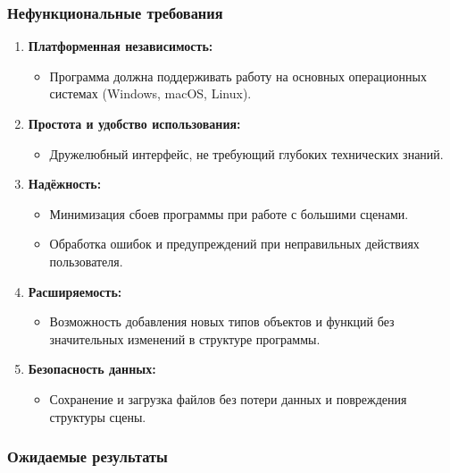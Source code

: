 \subsubsection{Нефункциональные требования}

\begin{enumerate}
    \item \textbf{Платформенная независимость:}
    \begin{itemize}
        \item Программа должна поддерживать работу на основных операционных системах (Windows, macOS, Linux).
    \end{itemize}
    
    \item \textbf{Простота и удобство использования:}
    \begin{itemize}
        \item Дружелюбный интерфейс, не требующий глубоких технических знаний.
    \end{itemize}
    
    \item \textbf{Надёжность:}
    \begin{itemize}
        \item Минимизация сбоев программы при работе с большими сценами.
        \item Обработка ошибок и предупреждений при неправильных действиях пользователя.
    \end{itemize}
    
    \item \textbf{Расширяемость:}
    \begin{itemize}
        \item Возможность добавления новых типов объектов и функций без значительных изменений в структуре программы.
    \end{itemize}
    
    \item \textbf{Безопасность данных:}
    \begin{itemize}
        \item Сохранение и загрузка файлов без потери данных и повреждения структуры сцены.
    \end{itemize}
\end{enumerate}

\subsubsection{Ожидаемые результаты}

